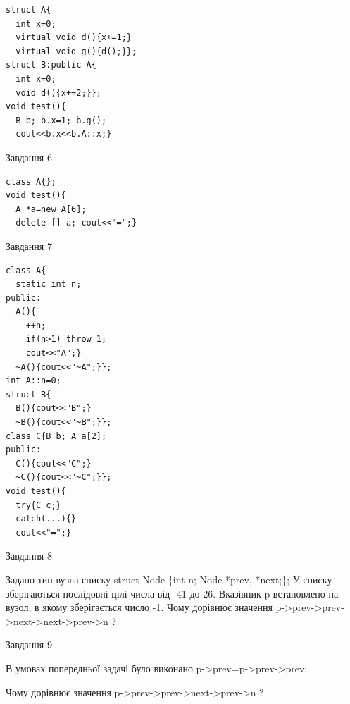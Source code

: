 \documentclass[12pt, ukrainian]{article}
\begin{document}
{{\begin{minipage}[t]{7cm}
\begin{verbatim}
struct A{
  int x=0;
  virtual void d(){x+=1;}
  virtual void g(){d();}};
struct B:public A{
  int x=0;
  void d(){x+=2;}};
void test(){
  B b; b.x=1; b.g();
  cout<<b.x<<b.A::x;}
\end{verbatim}            


               
{\begin{center}Завдання {6}\end{center}}
\vspace{-6mm}

\begin{verbatim}
class A{};
void test(){
  A *a=new A[6]; 
  delete [] a; cout<<"=";}
\end{verbatim}            


               
{\begin{center}Завдання {7}\end{center}}
\vspace{-6mm}

\begin{verbatim}
class A{
  static int n; 
public:
  A(){
    ++n; 
    if(n>1) throw 1;
    cout<<"A";}
  ~A(){cout<<"~A";}};
int A::n=0;
struct B{
  B(){cout<<"B";}
  ~B(){cout<<"~B";}};
class C{B b; A a[2];
public:
  C(){cout<<"C";}
  ~C(){cout<<"~C";}};
void test(){
  try{C c;} 
  catch(...){} 
  cout<<"=";}
\end{verbatim}            


\end{minipage}
               
{\begin{center}Завдання {8}\end{center}}
\vspace{-6mm}
Задано тип вузла списку
struct Node \{int n; Node *prev, *next;\};
У списку зберігаються послідовні цілі числа від -41 до 26. Вказівник p встановлено на вузол, в якому зберігається число -1.
Чому дорівнює значення p->prev->prev->next->next->prev->n ?\par

               
{\begin{center}Завдання {9}\end{center}}
\vspace{-6mm}
В умовах попередньої задачі було виконано p->prev=p->prev->prev;

Чому дорівнює значення p->prev->prev->next->prev->n ?\par

}}
\end{document}
